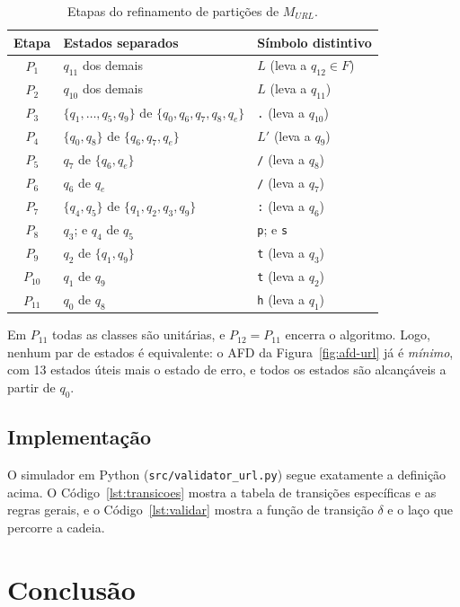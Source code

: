 \documentclass[12pt]{article}
\begin{document}
\begin{table}[htbp]
  \centering
  \small
  \begin{tabular}{c p{6.2cm} l}
    \hline
    Etapa & Estados separados & Símbolo distintivo \\
    \hline
    $P_1$  & $q_{11}$ dos demais                & $L$ (leva a $q_{12} \in F$) \\
    $P_2$  & $q_{10}$ dos demais                & $L$ (leva a $q_{11}$) \\
    $P_3$  & $\{q_1,\dots,q_5,q_9\}$ de $\{q_0,q_6,q_7,q_8,q_e\}$ & \texttt{.} (leva a $q_{10}$) \\
    $P_4$  & $\{q_0,q_8\}$ de $\{q_6,q_7,q_e\}$ & $L'$ (leva a $q_9$) \\
    $P_5$  & $q_7$ de $\{q_6,q_e\}$             & \texttt{/} (leva a $q_8$) \\
    $P_6$  & $q_6$ de $q_e$                     & \texttt{/} (leva a $q_7$) \\
    $P_7$  & $\{q_4,q_5\}$ de $\{q_1,q_2,q_3,q_9\}$ & \texttt{:} (leva a $q_6$) \\
    $P_8$  & $q_3$; e $q_4$ de $q_5$            & \texttt{p}; e \texttt{s} \\
    $P_9$  & $q_2$ de $\{q_1,q_9\}$             & \texttt{t} (leva a $q_3$) \\
    $P_{10}$ & $q_1$ de $q_9$                   & \texttt{t} (leva a $q_2$) \\
    $P_{11}$ & $q_0$ de $q_8$                   & \texttt{h} (leva a $q_1$) \\
    \hline
  \end{tabular}
  \caption{Etapas do refinamento de partições de $M_{URL}$.}
  \label{tab:moore}
\end{table}

Em $P_{11}$ todas as classes são unitárias, e $P_{12} = P_{11}$ encerra o
algoritmo. Logo, nenhum par de estados é equivalente: o AFD da
Figura~\ref{fig:afd-url} já é \emph{mínimo}, com 13 estados úteis mais o estado
de erro, e todos os estados são alcançáveis a partir de $q_0$.

\subsection{Implementação}
O simulador em Python (\texttt{src/validator\_url.py}) segue exatamente a
definição acima. O Código~\ref{lst:transicoes} mostra a tabela de transições
específicas e as regras gerais, e o Código~\ref{lst:validar} mostra a função
de transição $\delta$ e o laço que percorre a cadeia.





\section{Conclusão}
\end{document}
